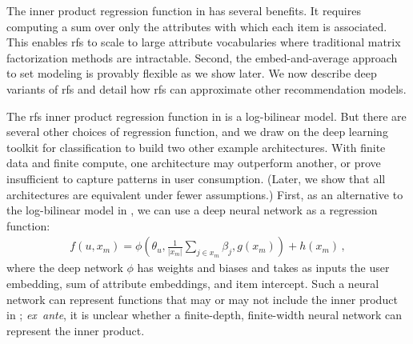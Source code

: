 The inner product regression function in  has several benefits. It requires computing a sum over only the attributes with which each item is associated. This enables \gls{rfs} to scale to large attribute vocabularies where traditional matrix factorization methods are intractable. Second, the embed-and-average approach to set modeling is provably flexible as we show later. We now describe deep variants of \gls{rfs} and detail how \gls{rfs} can approximate other recommendation models.%



The \gls{rfs} inner product regression function in  is a log-bilinear model. But there are several other choices of regression function, and we draw on the deep learning toolkit for classification to build two other example architectures. With finite data and finite compute, one architecture may outperform another, or prove insufficient to capture patterns in user consumption. (Later, we show that all architectures are equivalent under fewer assumptions.) First, as an alternative to the log-bilinear model in , we can use a deep neural network as a regression function:
\begin{align}
  f\left(u, x_m\right) = \phi\left(\theta_u, \frac{1}{|x_m|}\sum_{j\in x_m}
  \beta_j, g(x_m)\right) + h(x_m) \, ,
  \label{eqn:neural-network}
\end{align}
where the deep network $\phi$ has weights and biases and takes as inputs the user embedding, sum of attribute embeddings, and item intercept. Such a neural network can represent functions that may or may not include the inner product in ; \emph{ex~ante}, it is unclear whether a finite-depth, finite-width neural network can represent the inner product.


